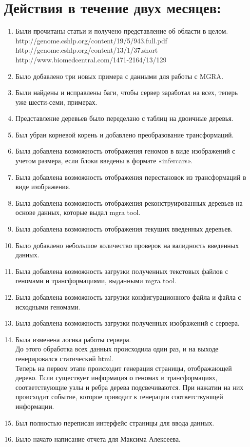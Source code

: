 \documentclass{article}
\begin{document}
\section{Действия в течение двух месяцев:}
\begin{enumerate}
	\item Были прочитаны статьи и получено представление об области в целом. \\
		http://genome.cshlp.org/content/19/5/943.full.pdf \\
		http://genome.cshlp.org/content/13/1/37.short \\
		http://www.biomedcentral.com/1471-2164/13/129 
	\item Было добавлено три новых примера с данными для работы с MGRA. 
	\item Были найдены и исправлены баги, чтобы сервер заработал на всех, теперь уже шести-семи, примерах. 
	\item Представление деревьев было переделано с таблиц на двоичные деревья. 
	\item Был убран корневой корень и добавлено преобразование трансформаций. 
	\item Была добавлена возможность отображения геномов в виде изображений с учетом размера, если блоки введены в формате «infercars».
	\item Была добавлена возможность отображения перестановок из трансформаций в виде изображения. 
	\item Была добавлена возможность отображения реконструированных деревьев на основе данных, которые выдал mgra tool. 
	\item Была добавлена возможность отображения текущих введенных деревьев. 
	\item Было добавлено небольшое количество проверок на валидность введенных данных. 
	\item Была добавлена возможность загрузки полученных текстовых файлов с геномами и трансформациями, выданными mgra tool. 
	\item Была добавлена возможность загрузки конфигурационного файла и файла с исходными геномами. 
	\item Была добавлена возможность загрузки полученных изображений с сервера.
	\item Была изменена логика работы сервера. \\
		До этого обработка всех данных происходила один раз, и на выходе генерировался статический html. \\  
		Теперь на первом этапе происходит генерация страницы, отображающей дерево. Если существует информация о геномах и трансформациях, соответствующие узлы и ребра дерева подсвечиваются. При нажатии на них происходит событие, которое приводит к генерации соответствующей информации.
	\item Был полностью переписан интерфейс страницы для ввода данных. 	
	\item Было начато написание отчета для Максима Алексеева. 
\end{enumerate}
\end{document}
